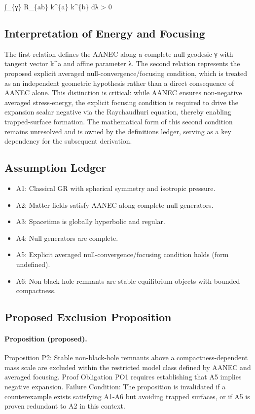 \documentclass[conference]{IEEEtran}
\begin{document}
∫\_\{γ\} R\_\{ab\} k\textasciicircum{}\{a\} k\textasciicircum{}\{b\} dλ > 0~\cite{cite_0ed84243cf171bc4}

\subsection{Interpretation of Energy and Focusing}
The first relation defines the AANEC along a complete null geodesic γ with tangent vector k\textasciicircum{}a and affine parameter λ. The second relation represents the proposed explicit averaged null-convergence/focusing condition, which is treated as an independent geometric hypothesis rather than a direct consequence of AANEC alone. This distinction is critical: while AANEC ensures non-negative averaged stress-energy, the explicit focusing condition is required to drive the expansion scalar negative via the Raychaudhuri equation, thereby enabling trapped-surface formation. The mathematical form of this second condition remains unresolved and is owned by the definitions ledger, serving as a key dependency for the subsequent derivation.~\cite{cite_0ed84243cf171bc4}

\subsection{Assumption Ledger}
\begin{itemize}
\item A1: Classical GR with spherical symmetry and isotropic pressure.
\item A2: Matter fields satisfy AANEC along complete null generators.
\item A3: Spacetime is globally hyperbolic and regular.
\item A4: Null generators are complete.
\item A5: Explicit averaged null-convergence/focusing condition holds (form undefined).
\item A6: Non-black-hole remnants are stable equilibrium objects with bounded compactness.
\end{itemize}

\subsection{Proposed Exclusion Proposition}
\paragraph{Proposition (proposed).} Proposition P2: Stable non-black-hole remnants above a compactness-dependent mass scale are excluded within the restricted model class defined by AANEC and averaged focusing. Proof Obligation PO1 requires establishing that A5 implies negative expansion. Failure Condition: The proposition is invalidated if a counterexample exists satisfying A1-A6 but avoiding trapped surfaces, or if A5 is proven redundant to A2 in this context.
\end{document}
